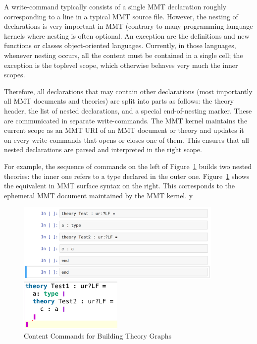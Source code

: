 A write-command typically consists of a single MMT declaration roughly corresponding to a line in a typical MMT source file.
However, the nesting of declarations is very important in MMT (contrary to many programming language kernels where nesting is often optional. An exception are the definitions and new functions or classes  object-oriented languages. Currently, in those languages, whenever nesting occurs, all the content must be contained in a single cell; the exception is the toplevel scope, which otherwise behaves very much the inner scopes.%

Therefore, all declarations that may contain other declarations (most importantly all MMT documents and theories) are split into parts as follows: the theory header, the list of nested declarations, and a special end-of-nesting marker. These are communicated in separate write-commands.
The MMT kernel maintains the current scope as an MMT URI of an MMT document or theory and updates it on every write-commands that opens or closes one of them.
This ensures that all nested declarations are parsed and interpreted in the right scope.

For example, the sequence of commands  on the left of Figure~\ref{fig:test_theory} builds two nested theories: the inner one refers to a type declared in the outer one. Figure~\ref{fig:test_theory} shows the equivalent in MMT surface syntax on the right. This corresponds to the ephemeral MMT document maintained by the MMT kernel.
y\begin{figure}[ht]\centering
\begin{minipage}[c]{10cm}\includegraphics[width=10cm]{test_theory_jupyter}\end{minipage}
\begin{minipage}[c]{5cm}\includegraphics[width=5cm]{test_theory}\end{minipage}
\caption{Content Commands for Building Theory Graphs}\label{fig:test_theory}
\end{figure}

